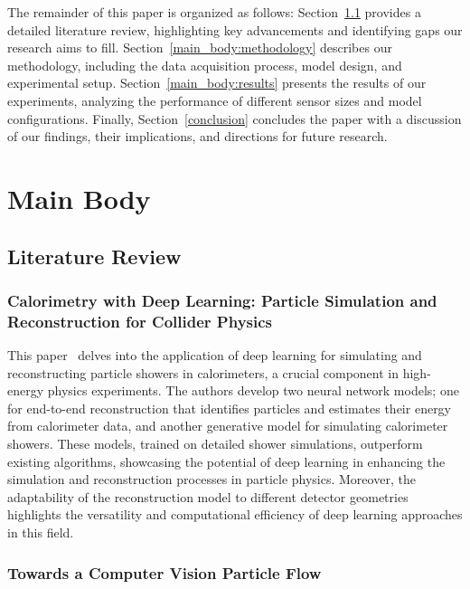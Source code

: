 \documentclass[conference]{IEEEtran}
\begin{document}
The remainder of this paper is organized as follows: Section~\ref{main_body:literature_review} provides a detailed literature review, highlighting key advancements and identifying gaps our research aims to fill. Section~\ref{main_body:methodology} describes our methodology, including the data acquisition process, model design, and experimental setup. Section~\ref{main_body:results} presents the results of our experiments, analyzing the performance of different sensor sizes and model configurations. Finally, Section~\ref{conclusion} concludes the paper with a discussion of our findings, their implications, and directions for future research.

\section{Main Body}
\label{main_body}

\subsection{Literature Review}
\label{main_body:literature_review}

\subsubsection{Calorimetry with Deep Learning: Particle Simulation and Reconstruction for Collider Physics}

This paper~\cite{Belayneh_2020} delves into the application of deep learning for simulating and reconstructing particle showers in calorimeters, a crucial component in high-energy physics experiments. The authors develop two neural network models; one for end-to-end reconstruction that identifies particles and estimates their energy from calorimeter data, and another generative model for simulating calorimeter showers. These models, trained on detailed shower simulations, outperform existing algorithms, showcasing the potential of deep learning in enhancing the simulation and reconstruction processes in particle physics. Moreover, the adaptability of the reconstruction model to different detector geometries highlights the versatility and computational efficiency of deep learning approaches in this field.

\subsubsection{Towards a Computer Vision Particle Flow}
\end{document}

